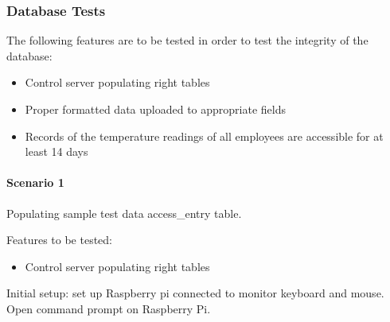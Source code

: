 \subsubsection{Database Tests}

The following features are to be tested in order to test the integrity of the
database:

\begin{itemize}
    \item Control server populating right tables 
    \item Proper formatted data uploaded to appropriate fields
    \item Records of the temperature readings of all employees are accessible
          for at least 14 days
\end{itemize}

\paragraph{Scenario 1}
Populating sample test data access\_entry table.

\noindent
Features to be tested:
\begin{itemize}
    \item Control server populating right tables
\end{itemize}

\noindent
Initial setup: set up Raspberry pi connected to monitor keyboard and mouse.
Open command prompt on Raspberry Pi.


